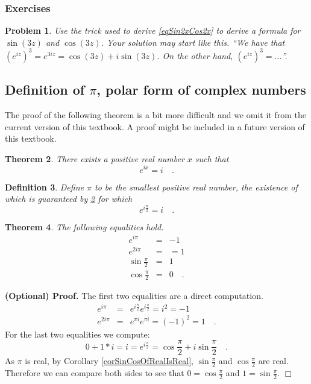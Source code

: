\documentclass[12pt]{book}
\newcommand{\importantFormula}[1]{\begin{equation} \boxed{#1} \end{equation}}
\newenvironment{proofOptional}[1][]{ \noindent \textbf{(Optional) Proof#1.}}{$\Box$\medskip}
\newtheorem{theorem}{Theorem}[section]
\newtheorem{definition}[theorem]{Definition}
\newtheorem{problem}[theorem]{Problem}
\begin{document}
\subsubsection{Exercises}
\begin{problem}
Use the trick used to derive \eqref{eqSin2xCos2x} to derive a formula for $\sin(3z)$ and $\cos (3z)$. Your solution may start like this. ``We have that $(e^{iz})^3=e^{3iz}=\cos (3z)+i\sin(3z)$. On the other hand, $(e^{iz})^3= \dots$''.
\end{problem}
\subsection{Definition of $\pi$, polar form of complex numbers}\label{secPolarFormComplexNumbers}
\label{secDefinitionPi}

The proof of the following theorem is a bit more difficult and we omit it from the current version of this textbook. A proof might be included in a future version of this textbook.
\begin{theorem}\label{thPiExists}
There exists a positive real number $x$ such that \index{$\pi$}
\importantFormula{
e^{ix}=i\quad .
}
\end{theorem}

\begin{definition}
Define $\pi$ to be the smallest positive real number, the existence of which is guaranteed by \ref{thPiExists} for which
\importantFormula{
e^{i\frac{\pi}{2} }= i\quad .
}
\end{definition}



\begin{theorem} The following equalities hold.
\begin{equation}\label{eqe^ipi}
\begin{array}{rcl}
\displaystyle e^{i\pi}&=&-1\\
\displaystyle e^{2i\pi}&=&=1\\
\displaystyle \sin \frac{\pi}2 &=& 1\\
\displaystyle \cos \frac{\pi}2 &=& 0\quad .
\end{array}
\end{equation}
\end{theorem}
\begin{proofOptional}
The first two equalities are a direct computation.
\[
\begin{array}{rcl}
\displaystyle e^{i\pi}&=&\displaystyle  e^{i\frac{\pi}2}e^{i\frac{\pi}2}= i^2= -1\\
\displaystyle e^{2i\pi}&=&\displaystyle  e^{\pi i} e^{\pi i}= (-1)^2=1\quad .
\end{array}
\]
For the last two equalities we compute:
\[
0+ 1*i=i=e^{i\frac{\pi}2}= \cos \frac{\pi}2 + i\sin \frac\pi 2\quad .
\]
As $\pi$ is real, by Corollary \ref{corSinCosOfRealIsReal}, $\sin\frac{\pi}{2}$ and $\cos \frac{\pi}{2}$ are real. Therefore we can compare both sides to see that $0=\cos \frac{\pi}{2}$ and $1=\sin \frac \pi 2$.
\end{proofOptional}
\end{document}
